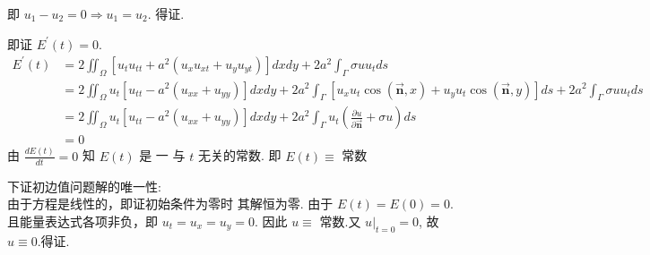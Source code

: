 \begin{questions}
\begin{solution}
即 $ u_{1}-u_{2}=0 \Rightarrow u_{1}=u_{2} $. 得证.
\end{solution}
\begin{solution}
即证 $ E^{\prime}(t)=0 $.
$$
\begin{aligned}
E^{\prime}(t)&=2 \iint_{\Omega}\left[u_{t} u_{t t}+a^{2}\left(u_{x} u_{x t}+u_{y} u_{y t}\right)\right] d x d y+2 a^{2} \int_{\Gamma} \sigma uu_{t} d s \\
&=2 \iint_{\Omega} u_{t}\left[u_{t t}-a^{2}\left(u_{x x}+u_{y y}\right)\right] d x d y +2 a^{2} \int_{\Gamma}\left[u_{x} u_{t} \cos (\vec{\boldsymbol n}, x)+u_{y} u_{t} \cos (\vec{\boldsymbol n}, y)\right] d s+2 a^{2} \int_{\Gamma} \sigma uu_{t} d s \\
&=2 \iint_{\Omega} u_{t}\left[u_{t t}-a^{2}\left(u_{x x}+u_{y y}\right)\right] d x d y+2 a^{2} \int_{\Gamma} u_{t}\left(\frac{\partial u}{\partial \vec{\boldsymbol n}}+\sigma u\right) d s \\
&=0 
\end{aligned}
$$
由 $ \frac{d E(t)}{d t}=0 $ 知 $ E(t) $ 是 一 与 $t$ 无关的常数. 即 $ E(t) \equiv $ 常数

下证初边值问题解的唯一性:\\
由于方程是线性的，即证初始条件为零时 其解恒为零.
由于 $ E(t)=E(0)=0 $.
且能量表达式各项非负，即 $ u_{t}=u_{x}=u_{y}=0 $.
因此 $u \equiv$ 常数.又 $\left.u\right|_{t=0}=0$, 故$ u \equiv 0 .$得证.
\end{solution}
\end{questions}